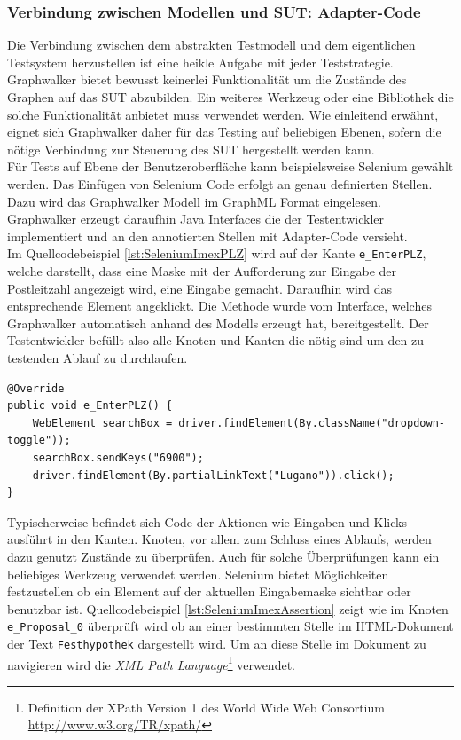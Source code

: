 \subsubsection{Verbindung zwischen Modellen und \Gls{SUT}: Adapter-Code}
Die Verbindung zwischen dem abstrakten Testmodell und dem eigentlichen Testsystem herzustellen ist eine heikle Aufgabe mit jeder Teststrategie. Graphwalker bietet bewusst keinerlei Funktionalität um die Zustände des Graphen auf das \Gls{SUT} abzubilden. Ein weiteres Werkzeug oder eine Bibliothek die solche Funktionalität anbietet muss verwendet werden. Wie einleitend erwähnt, eignet sich Graphwalker daher für das Testing auf beliebigen Ebenen, sofern die nötige Verbindung zur Steuerung des \Gls{SUT} hergestellt werden kann.\\
Für Tests auf Ebene der Benutzeroberfläche kann beispielsweise Selenium gewählt werden. Das Einfügen von Selenium Code erfolgt an genau definierten Stellen. Dazu wird das Graphwalker Modell im GraphML Format eingelesen. Graphwalker erzeugt daraufhin Java Interfaces die der Testentwickler implementiert und an den annotierten Stellen mit Adapter-Code versieht.\\ Im Quellcodebeispiel \ref{lst:SeleniumImexPLZ} wird auf der Kante \texttt{e\_EnterPLZ}, welche darstellt, dass eine Maske mit der Aufforderung zur Eingabe der Postleitzahl angezeigt wird, eine Eingabe gemacht. Daraufhin wird das entsprechende Element angeklickt. Die Methode wurde vom Interface, welches Graphwalker automatisch anhand des Modells erzeugt hat, bereitgestellt. Der Testentwickler befüllt also alle Knoten und Kanten die nötig sind um den zu testenden Ablauf zu durchlaufen. 

\begin{lstlisting}[caption={Auf einer Kante wird mittels Selenium eine Eingabe und ein Klick durchgeführt.}, label=lst:SeleniumImexPLZ, float]
@Override
public void e_EnterPLZ() {
    WebElement searchBox = driver.findElement(By.className("dropdown-toggle"));
    searchBox.sendKeys("6900");
    driver.findElement(By.partialLinkText("Lugano")).click();
}
\end{lstlisting}

Typischerweise befindet sich Code der Aktionen wie Eingaben und Klicks ausführt in den Kanten. Knoten, vor allem zum Schluss eines Ablaufs, werden dazu genutzt Zustände zu überprüfen. Auch für solche Überprüfungen kann ein beliebiges Werkzeug verwendet werden. Selenium bietet Möglichkeiten festzustellen ob ein Element auf der aktuellen Eingabemaske sichtbar oder benutzbar ist. Quellcodebeispiel \ref{lst:SeleniumImexAssertion} zeigt wie im Knoten \texttt{e\_Proposal\_0} überprüft wird ob an einer bestimmten Stelle im HTML-Dokument der Text \texttt{Festhypothek} dargestellt wird. Um an diese Stelle im Dokument zu navigieren wird die \textit{XML Path Language}\footnote{Definition der XPath Version 1 des World Wide Web Consortium \url{http://www.w3.org/TR/xpath/}} verwendet.

